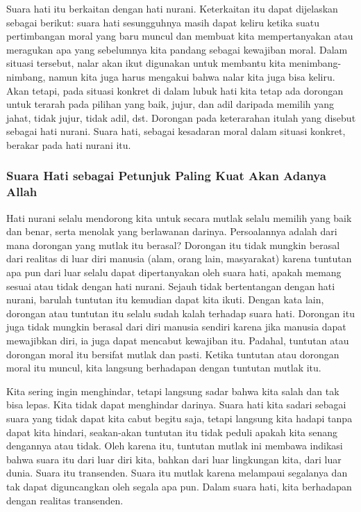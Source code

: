 \documentclass[10pt,a4paper]{article}
\begin{document}
\begin{multicols}{2}
Suara hati itu berkaitan dengan hati nurani. Keterkaitan itu dapat
dijelaskan sebagai berikut: suara hati sesungguhnya masih dapat keliru
ketika suatu pertimbangan moral yang baru muncul dan membuat kita
mempertanyakan atau meragukan apa yang sebelumnya kita pandang sebagai
kewajiban moral. Dalam situasi tersebut, nalar akan ikut digunakan untuk
membantu kita menimbang-nimbang, namun kita juga harus mengakui bahwa
nalar kita juga bisa keliru. Akan tetapi, pada situasi konkret di dalam
lubuk hati kita tetap ada dorongan untuk terarah pada pilihan yang baik,
jujur, dan adil daripada memilih yang jahat, tidak jujur, tidak adil,
dst. Dorongan pada keterarahan itulah yang disebut sebagai hati nurani.
Suara hati, sebagai kesadaran moral dalam situasi konkret, berakar pada
hati nurani itu.

\hypertarget{suara-hati-sebagai-petunjuk-paling-kuat-akan-adanya-allah}{%
\subsubsection{Suara Hati sebagai Petunjuk Paling Kuat Akan Adanya
Allah}\label{suara-hati-sebagai-petunjuk-paling-kuat-akan-adanya-allah}}

Hati nurani selalu mendorong kita untuk secara mutlak selalu memilih
yang baik dan benar, serta menolak yang berlawanan darinya. Persoalannya
adalah dari mana dorongan yang mutlak itu berasal? Dorongan itu tidak
mungkin berasal dari realitas di luar diri manusia (alam, orang lain,
masyarakat) karena tuntutan apa pun dari luar selalu dapat dipertanyakan
oleh suara hati, apakah memang sesuai atau tidak dengan hati nurani.
Sejauh tidak bertentangan dengan hati nurani, barulah tuntutan itu
kemudian dapat kita ikuti. Dengan kata lain, dorongan atau tuntutan itu
selalu sudah kalah terhadap suara hati. Dorongan itu juga tidak mungkin
berasal dari diri manusia sendiri karena jika manusia dapat mewajibkan
diri, ia juga dapat mencabut kewajiban itu. Padahal, tuntutan atau
dorongan moral itu bersifat mutlak dan pasti. Ketika tuntutan atau
dorongan moral itu muncul, kita langsung berhadapan dengan tuntutan
mutlak itu.

Kita sering ingin menghindar, tetapi langsung sadar bahwa kita salah dan
tak bisa lepas. Kita tidak dapat menghindar darinya. Suara hati kita
sadari sebagai suara yang tidak dapat kita cabut begitu saja, tetapi
langsung kita hadapi tanpa dapat kita hindari, seakan-akan tuntutan itu
tidak peduli apakah kita senang dengannya atau tidak. Oleh karena itu,
tuntutan mutlak ini membawa indikasi bahwa suara itu dari luar diri
kita, bahkan dari luar lingkungan kita, dari luar dunia. Suara itu
transenden. Suara itu mutlak karena melampaui segalanya dan tak dapat
diguncangkan oleh segala apa pun. Dalam suara hati, kita berhadapan
dengan realitas transenden.


\end{multicols}
\end{document}
